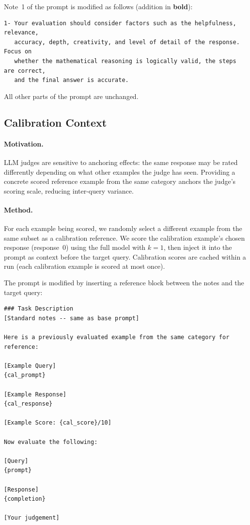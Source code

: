\documentclass{article}
\begin{document}
Note~1 of the prompt is modified as follows (addition in \textbf{bold}):

\begin{lstlisting}[style=prompt]
1- Your evaluation should consider factors such as the helpfulness, relevance,
   accuracy, depth, creativity, and level of detail of the response. Focus on
   whether the mathematical reasoning is logically valid, the steps are correct,
   and the final answer is accurate.
\end{lstlisting}

All other parts of the prompt are unchanged.

\subsection{Calibration Context}
\label{sec:calibration}

\paragraph{Motivation.} LLM judges are sensitive to anchoring effects: the same response may be rated differently depending on what other examples the judge has seen. Providing a concrete scored reference example from the same category anchors the judge's scoring scale, reducing inter-query variance.

\paragraph{Method.} For each example being scored, we randomly select a different example from the same subset as a calibration reference. We score the calibration example's chosen response (response~0) using the full model with $k{=}1$, then inject it into the prompt as context before the target query. Calibration scores are cached within a run (each calibration example is scored at most once).

The prompt is modified by inserting a reference block between the notes and the target query:

\begin{lstlisting}[style=prompt]
### Task Description
[Standard notes -- same as base prompt]

Here is a previously evaluated example from the same category for reference:

[Example Query]
{cal_prompt}

[Example Response]
{cal_response}

[Example Score: {cal_score}/10]

Now evaluate the following:

[Query]
{prompt}

[Response]
{completion}

[Your judgement]
\end{lstlisting}
\end{document}

